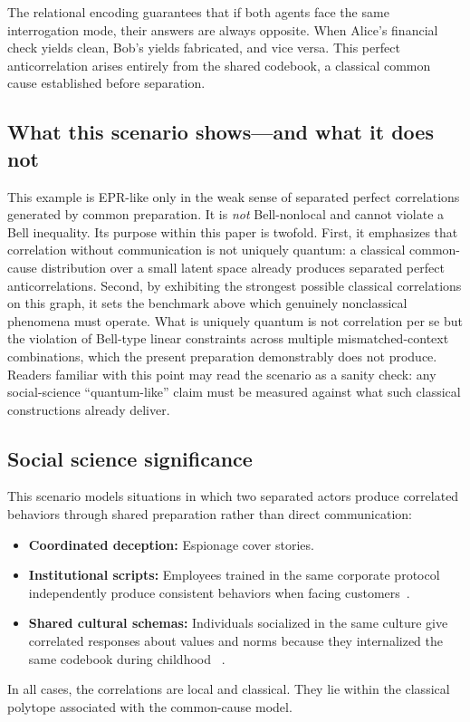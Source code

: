 \documentclass[aps,pra,twocolumn,superscriptaddress,floatfix,longbibliography]{revtex4-2}
\begin{document}
The relational encoding guarantees that if both agents face the same
interrogation mode, their answers are always opposite. When Alice's
financial check yields clean, Bob's yields fabricated, and vice
versa. This perfect anticorrelation arises entirely from the shared
codebook, a classical common cause established before separation.

\subsection{What this scenario shows---and what it does not}

This example is EPR-like only in the weak sense of separated perfect
correlations generated by common preparation. It is \emph{not}
Bell-nonlocal and cannot violate a Bell inequality. Its purpose
within this paper is twofold. First, it emphasizes that correlation
without communication is not uniquely quantum: a classical
common-cause distribution over a small latent space already produces
separated perfect anticorrelations. Second, by exhibiting the
strongest possible classical correlations on this graph, it sets the
benchmark above which genuinely nonclassical phenomena must operate.
What is uniquely quantum is not correlation per se but the
violation of Bell-type linear constraints across multiple
mismatched-context combinations, which the present preparation
demonstrably does not produce. Readers familiar with this point may
read the scenario as a sanity check: any social-science
``quantum-like'' claim must be measured against what such classical
constructions already deliver.

\subsection{Social science significance}

This scenario models situations in which two separated actors produce
correlated behaviors through shared preparation rather than direct
communication:
\begin{itemize}
\item \textbf{Coordinated deception:} Espionage cover stories.
\item \textbf{Institutional scripts:} Employees trained in the same
corporate protocol independently produce consistent behaviors when
facing customers~\cite{Cyert1963}.
\item \textbf{Shared cultural schemas:} Individuals socialized in
the same culture give correlated responses about values and norms
because they internalized the same codebook during childhood
~\cite{bordieu-fu}.
\end{itemize}
In all cases, the correlations are local and classical. They lie
within the classical polytope associated with the common-cause model.
\end{document}
